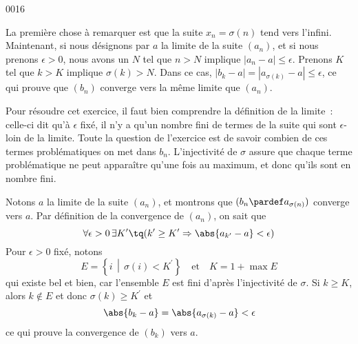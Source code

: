 
\begin{corrige}{0016}

La première chose à remarquer est que la suite $x_n=\sigma(n)$ tend vers l'infini. Maintenant, si nous désignons par $a$ la limite de la suite $(a_n)$, et si nous prenons $\epsilon>0$, nous avons un $N$ tel que $n>N$ implique $| a_n-a |\leq\epsilon$. Prenons $K$ tel que $k>K$ implique $\sigma(k)>N$. Dans ce cas, $| b_k-a |=| a_{\sigma(k)}-a |\leq\epsilon$, ce qui prouve que $(b_n)$ converge vers la même limite que $(a_n)$.


\begin{alternative}

\begin{remark}
  Pour résoudre cet exercice, il faut bien comprendre la définition de la limite~: celle-ci dit qu'à $\epsilon$ fixé, il n'y a qu'un nombre fini de termes de la suite qui sont \og$\epsilon$-loin\fg{} de la limite. Toute la question de l'exercice est de savoir combien de ces termes \og problématiques\fg{} on met dans $b_n$. L'injectivité de $\sigma$ assure que chaque terme \og problématique\fg{} ne peut apparaître qu'une fois au maximum, et donc qu'ils sont en nombre fini.
\end{remark}

Notons $a$ la limite de la suite $(a_n)$, et montrons que
$(b_n \pardef a_{\sigma(n)})$ converge vers $a$. Par définition de la
convergence de $(a_n)$, on sait que
\begin{equation*}
  \forall \epsilon > 0\, \exists K^\prime \tq (k^\prime \geq K^\prime \Rightarrow \abs{a_{k^\prime} - a} < \epsilon)
\end{equation*}
Pour $\epsilon > 0$ fixé, notons
\begin{equation*}
  E = \left\{ i \,\middle\vert\, \sigma(i) < K^\prime \right\}
  \quad\text{et}\quad K = 1 + \max E
\end{equation*}
qui existe bel et bien, car l'ensemble $E$ est fini d'après
l'injectivité de $\sigma$. Si $k \geq K$, alors $k \not\in E$ et donc
$\sigma(k) \geq K^\prime$ et
\begin{equation*}
  \abs{b_k - a} = \abs{a_{\sigma(k)} - a} < \epsilon
\end{equation*}
ce qui prouve la convergence de $(b_k)$ vers $a$.
\end{alternative}

\end{corrige}
